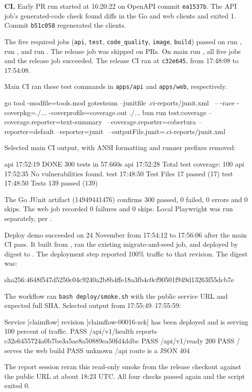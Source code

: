 \textbf{CI.}
Early PR run  started at 16:20:22 on OpenAPI commit \texttt{ea1537b}. The API job's generated-code check found diffs in the Go and web clients and exited 1. Commit \texttt{b51c058} regenerated the clients.

The five required jobs (\texttt{api}, \texttt{test}, \texttt{code\_quality}, \texttt{image}, \texttt{build}) passed on  run ,  run , and  run . The release job was skipped on PRs. On main run , all five jobs and the release job succeeded. The release CI ran at \texttt{c32e645}, from 17:48:08 to 17:54:08.

Main CI ran these test commands in \texttt{apps/api} and \texttt{apps/web}, respectively.
\begin{record}
go tool -modfile=tools.mod gotestsum --junitfile .ci-reports/junit.xml \
  -- -race -coverpkg=./... -coverprofile=coverage.out ./...
bun run test:coverage --coverage.reporter=text-summary \
  --coverage.reporter=cobertura --reporter=default --reporter=junit \
  --outputFile.junit=.ci-reports/junit.xml
\end{record}
Selected main CI output, with ANSI formatting and runner prefixes removed:
\begin{record}
api   17:52:19  DONE 300 tests in 57.660s
api   17:52:28  Total test coverage: 100%
api   17:52:35  No vulnerabilities found.
test  17:48:50  Test Files  17 passed (17)
test  17:48:50  Tests       139 passed (139)
\end{record}
The Go JUnit artifact (14949441476) confirms 300 passed, 0 failed, 0 errors and 0 skips. The web job recorded 0 failures and 0 skips. Local Playwright was run separately, per .

\clearpage
\partsection{B-06}{Cloud Run deployment and public smoke}
\label{ev:deploy}
Deploy demo  succeeded on 24 November from 17:54:12 to 17:56:06 after the main CI pass. It built from \releaseSHA{}, ran the existing migrate-and-seed job, and deployed by digest to \revision{}. The deployment step reported 100\% traffic to that revision. The digest was:
\begin{record}
sha256:4648f547d5250c04c9240a2b8b4ffe18a3fb4c0cf90501f949d13263f55dcb7e
\end{record}

The workflow ran \texttt{bash deploy/smoke.sh} with the public service URL and expected full SHA. Selected output from 17:55:49--17:55:59:
\begin{record}
Service [claimflow] revision [claimflow-00016-zck] has been deployed and is serving 100 percent of traffic.
PASS /api/v1/health reports c32e6455724a0b7be3a5ae8a50889ea50fd4ddbc
PASS /api/v1/ready 200
PASS / serves the web build
PASS unknown /api route is a JSON 404
\end{record}
The report session reran this read-only smoke from the release checkout against the public URL at about 18:23 UTC. All four checks passed again and the script exited 0.

